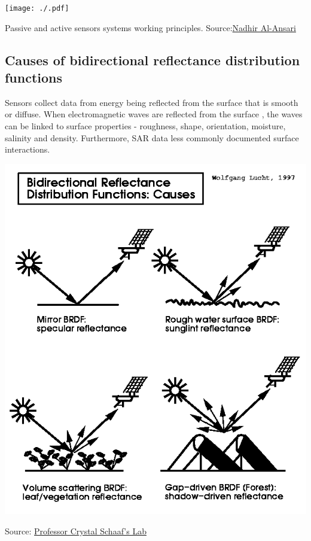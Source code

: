 \documentclass[
  letterpaper,
  DIV=11,
  numbers=noendperiod]{scrreprt}
\begin{document}
\texttt{[image: ./.pdf]}

Passive and active sensors systems working principles.
Source:\href{source:\%20https://www.researchgate.net/figure/Passive-and-active-sensors-systems-working-principles-24_fig2_344464269}{Nadhir
Al-Ansari}

\hypertarget{causes-of-bidirectional-reflectance-distribution-functions}{%
\subsection{Causes of bidirectional reflectance distribution
functions}\label{causes-of-bidirectional-reflectance-distribution-functions}}

Sensors collect data from energy being reflected from the surface that
is smooth or diffuse. When electromagnetic waves are reflected from the
surface , the waves can be linked to surface properties - roughness,
shape, orientation, moisture, salinity and density. Furthermore, SAR
data less commonly documented surface interactions.

\includegraphics{./images/paste-B1C42757.png}

Source:
\href{https://www.umb.edu/spectralmass/terra_aqua_modis/modis}{Professor
Crystal Schaaf's Lab}
\end{document}

